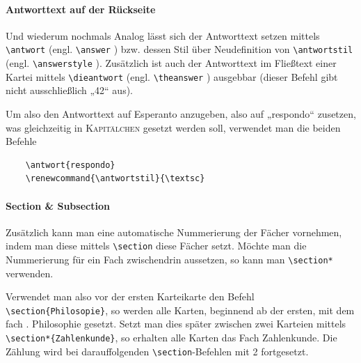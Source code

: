 \documentclass[a4paper,DIV=calc]{scrartcl}
\begin{document}
\paragraph{Antworttext auf der Rückseite}\label{par:Antwort} Und wiederum nochmals Analog lässt sich der Antworttext setzen mittels \lstinline!\antwort! (engl. \lstinline!\answer! ) bzw. dessen Stil über Neudefinition von \lstinline!\antwortstil! (engl. \lstinline!\answerstyle! ). Zusätzlich ist auch der Antworttext im Fließtext einer Kartei mittels \lstinline!\dieantwort! (engl. \lstinline!\theanswer! ) ausgebbar (dieser Befehl gibt nicht ausschließlich „42“ aus).

Um also den Antworttext auf Esperanto anzugeben, also auf „respondo“ zusetzen, was gleichzeitig in \textsc{Kapitälchen} gesetzt werden soll, verwendet man die beiden Befehle
\begin{lstlisting}
	\antwort{respondo}
	\renewcommand{\antwortstil}{\textsc}
\end{lstlisting}

\paragraph{Section \& Subsection} Zusätzlich kann man eine automatische Nummerierung der Fächer vornehmen, indem man diese mittels \lstinline!\section!  diese Fächer setzt. Möchte man die Nummerierung für ein Fach zwischendrin aussetzen, so kann man \lstinline!\section*! verwenden.

Verwendet man also vor der ersten Karteikarte den Befehl \lstinline!\section{Philosopie}!, so werden alle Karten, beginnend ab der ersten, mit dem fach {. Philosophie} gesetzt. Setzt man dies später zwischen zwei Karteien mittels \lstinline!\section*{Zahlenkunde}!, so erhalten alle Karten das Fach {\sffamily Zahlenkunde}. Die Zählung wird bei darauffolgenden \lstinline!\section!-Befehlen mit 2 fortgesetzt.
\end{document}
